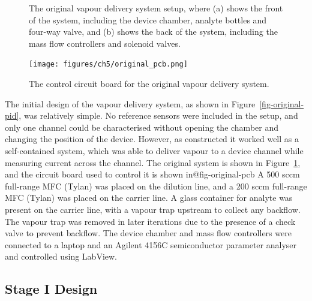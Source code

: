 \documentclass[
  a4paper,
]{scrbook}
\begin{document}
\begin{figure}
\begin{minipage}[t]{0.57\linewidth}
{{}

}

\subcaption{\label{fig-original-back}}
\end{minipage}%

\caption{\label{fig-original-setup}The original vapour delivery system
setup, where (a) shows the front of the system, including the device
chamber, analyte bottles and four-way valve, and (b) shows the back of
the system, including the mass flow controllers and solenoid valves.}

\end{figure}

\begin{figure}

{\centering \texttt{[image: figures/ch5/original\_pcb.png]}

}

\caption{\label{fig-original-pcb}The control circuit board for the
original vapour delivery system.}

\end{figure}

The initial design of the vapour delivery system, as shown in
Figure~\ref{fig-original-pid}, was relatively simple. No reference
sensors were included in the setup, and only one channel could be
characterised without opening the chamber and changing the position of
the device. However, as constructed it worked well as a self-contained
system, which was able to deliver vapour to a device channel while
measuring current across the channel. The original system is shown in
Figure~\ref{fig-original-setup}, and the circuit board used to control
it is shown in@fig-original-pcb A 500 sccm full-range MFC (Tylan) was
placed on the dilution line, and a 200 sccm full-range MFC (Tylan) was
placed on the carrier line. A glass container for analyte was present on
the carrier line, with a vapour trap upstream to collect any backflow.
The vapour trap was removed in later iterations due to the presence of a
check valve to prevent backflow. The device chamber and mass flow
controllers were connected to a laptop and an Agilent 4156C
semiconductor parameter analyser and controlled using LabView.

\hypertarget{sec-vapour-system-design-1}{%
\subsection{Stage I Design}\label{sec-vapour-system-design-1}}
\end{document}
